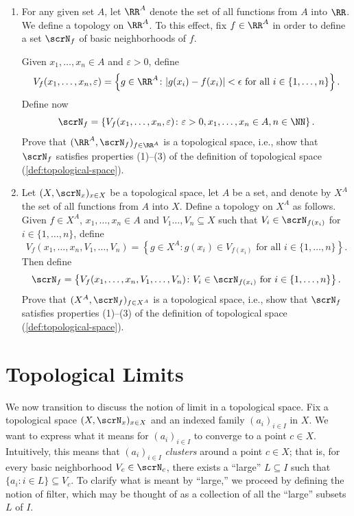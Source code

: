 \begin{exercises}\hfill

\begin{enumerate}

\item
  For any given set $A$, let  $\RR^A$ denote the set of all functions from $A$ into $\RR$.
  We define a topology on $\RR^A$.
  To this effect, fix $f\in\RR^A$ in order to define a set $\scrN_f$ of basic neighborhoods of $f$.

  Given $x_1,\dots,x_n \in A$ and $\varepsilon > 0$, define
  \[
    V_f(x_1,\dots, x_n,\varepsilon)=
    \left\{g\in \RR^A \colon | g(x_i)-f(x_i) |<\epsilon \text{ for all } i\in \{ 1,\dots, n\} \right\}.
  \]
  Define now
  \[
    \scrN_f = \left\{ V_f(x_1,\dots, x_n,\varepsilon) \colon \varepsilon >0, x_1,\dots,x_n\in A, n\in\NN \right\}.
  \]
  Prove that  $(\RR^A, \scrN_f )_{f\in \RR^A}$ is a topological space, i.e., show that $\scrN_f$ satisfies properties (1)--(3) of the definition of topological space (\cref{def:topological-space}).

\item
  Let $(X, \scrN_x )_{x\in X }$ be a topological space, let $A$ be a set, and denote by  $X^A$ the set of all functions from $A$ into $X$.
  Define a topology on $X^A$ as follows.
  Given $f\in X^A$,    $x_1,\dots,x_n \in A $ and  $V_1\dots, V_n\subseteq X$ such that $V_i\in \scrN_{f(x_i)}$ for  $i\in \{ 1,\dots, n\}$, define
  \[
    V_f(x_1,\dots, x_n,V_1,\dots, V_n)=
    \left\{g\in X^A \colon g(x_i)\in V_{f(x_i)}
    \text{ for all } i\in \{ 1,\dots, n\} \right\}.
  \]
  Then define
  \[
    \scrN_f = \left\{ V_f(x_1,\dots, x_n,V_1,\dots, V_n) \colon \text{$V_i\in \scrN_{f(x_i)}$ for  $i\in \{ 1,\dots, n\}$} \right\}.
  \]
  Prove that  $(X^A, \scrN_f )_{f\in X^A}$ is a topological space, i.e., show that $\scrN_f$ satisfies properties (1)--(3) of the definition of topological space (\cref{def:topological-space}).

\end{enumerate}

\end{exercises}

\section{Topological Limits}

We now transition to discuss the notion of limit in a topological space.
Fix a topological space $(X,\scrN_x)_{x\in X}$ and an indexed family $(a_i)_{i\in I}$ in $X$.
We want to express what it means for $(a_i)_{i\in I}$ to converge to a point $c\in X$.
Intuitively, this means that $(a_i)_{i\in I}$ \emph{clusters} around a point $c\in X$;
that is, for every basic neighborhood $V_c\in \scrN_c$, there exists a “large” $L\subseteq I$ such that $\{a_i \colon i\in L\}\subseteq V_c$.
To clarify what is meant by “large,” we proceed by defining the notion of filter, which may be thought of as a collection of all the “large” subsets $L$ of $I$.

